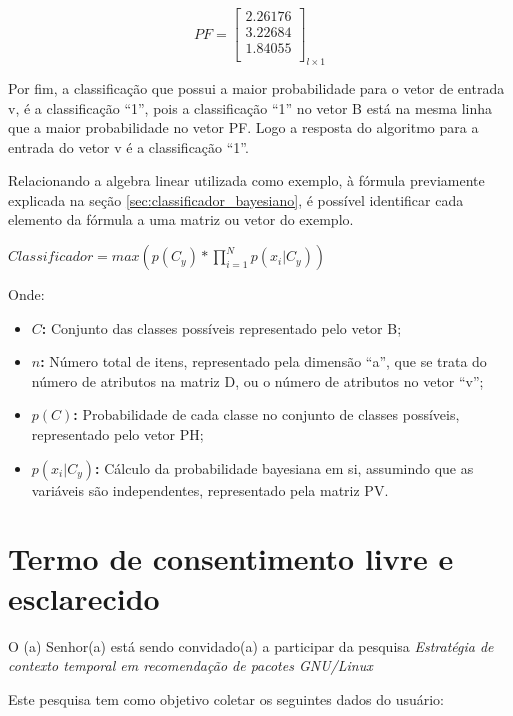\begin{anexosenv}
\begin{center}
$$PF=\left[
\begin{array}{c}
2.26176 \\
3.22684 \\
1.84055 \\
\end{array}
\right]_{l \times 1}
$$
\end{center}

Por fim, a classificação que possui a maior probabilidade para o vetor de
entrada v, é a classificação ``1'', pois a classificação ``1'' no vetor
B está na mesma linha que a maior probabilidade no vetor PF. Logo a resposta
do algoritmo para a entrada do vetor v é a classificação ``1''.

Relacionando a algebra linear utilizada como exemplo, à fórmula previamente
explicada na seção \ref{sec:classificador_bayesiano}, é possível identificar cada
elemento da fórmula a uma matriz ou vetor do exemplo.

$Classificador = max(p(C_{y})*\prod_{i=1}^{N}p(x_{i}|C_{y}))$

Onde:

\begin{itemize}
    \item \textbf{$C$:} Conjunto das classes possíveis representado pelo vetor B;
    \item \textbf{$n$: } Número total de itens, representado pela dimensão ``a'',
    que se trata do número de atributos na matriz D, ou o número de atributos
    no vetor ``v'';
    \item \textbf{$p(C)$: } Probabilidade de cada classe no conjunto de classes
    possíveis, representado pelo vetor PH;
    \item \textbf{$p(x_{i}|C_{y})$: } Cálculo da probabilidade bayesiana
    em si, assumindo que as variáveis são independentes, representado pela
    matriz PV.
\end{itemize}


\chapter{Termo de consentimento livre e esclarecido}

O (a) Senhor(a) está sendo convidado(a) a participar da pesquisa
\textit{Estratégia de contexto temporal em recomendação de pacotes GNU/Linux}

Este pesquisa tem como objetivo coletar os seguintes dados do usuário:


\end{anexosenv}
